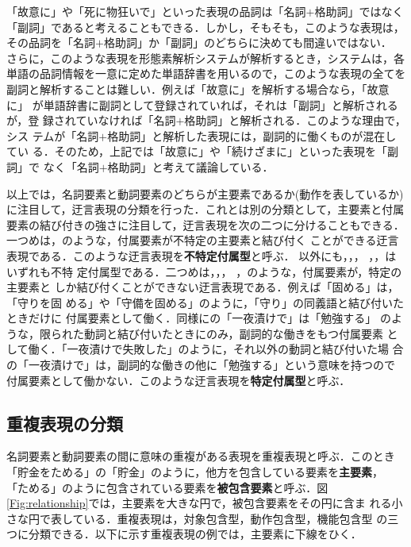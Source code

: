 \documentclass{nlp}
\begin{document}
「故意に」や「死に物狂いで」といった表現の品詞は「名詞$+$格助詞」ではなく
「副詞」であると考えることもできる．しかし，そもそも，このような表現は，
その品詞を「名詞$+$格助詞」か「副詞」のどちらに決めても間違いではない．
さらに，このような表現を形態素解析システムが解析するとき，システムは，各
単語の品詞情報を一意に定めた単語辞書を用いるので，このような表現の全てを
副詞と解析することは難しい．例えば「故意に」を解析する場合なら，「故意に」
が単語辞書に副詞として登録されていれば，それは「副詞」と解析されるが，登
録されていなければ「名詞$+$格助詞」と解析される．このような理由で，シス
テムが「名詞$+$格助詞」と解析した表現には，副詞的に働くものが混在してい
る．そのため，上記では「故意に」や「続けざまに」といった表現を「副詞」で
なく「名詞$+$格助詞」と考えて議論している．

以上では，名詞要素と動詞要素のどちらが主要素であるか(動作を表しているか)
に注目して，迂言表現の分類を行った．これとは別の分類として，主要素と付属
要素の結び付きの強さに注目して，迂言表現を次の二つに分けることもできる．
一つめは，のような，付属要素が不特定の主要素と結び付く
ことができる迂言表現である．このような迂言表現を{\bf 不特定付属型}と呼ぶ．
以外にも，，，
，，はいずれも不特
定付属型である．二つめは，，，
，のような，付属要素が，特定の主要素と
しか結び付くことができない迂言表現である．例えば「固める」は，「守りを固
める」や「守備を固める」のように，「守り」の同義語と結び付いたときだけに
付属要素として働く．同様にの「一夜漬けで」は「勉強する」
のような，限られた動詞と結び付いたときにのみ，副詞的な働きをもつ付属要素
として働く．「一夜漬けで失敗した」のように，それ以外の動詞と結び付いた場
合の「一夜漬けで」は，副詞的な働きの他に「勉強する」という意味を持つので
付属要素として働かない．このような迂言表現を{\bf 特定付属型}と呼ぶ．




\subsection{重複表現の分類}
\label{inclusion-type}
名詞要素と動詞要素の間に意味の重複がある表現を重複表現と呼ぶ．このとき
「貯金をためる」の「貯金」のように，他方を包含している要素を{\bf 主要素}，
「ためる」のように包含されている要素を{\bf 被包含要素}と呼ぶ．図
\ref{Fig:relationship}では，主要素を大きな円で，被包含要素をその円に含ま
れる小さな円で表している．重複表現は，対象包含型，動作包含型，機能包含型
の三つに分類できる．以下に示す重複表現の例では，主要素に下線をひく．
\end{document}
